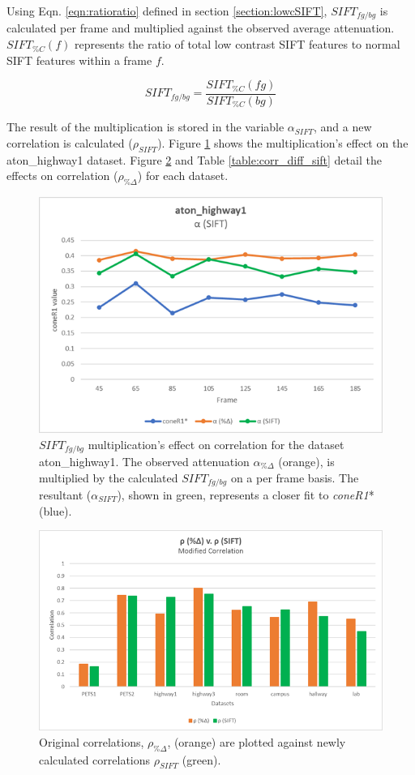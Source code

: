 Using Eqn. \ref{eqn:ratioratio} defined in section \ref{section:lowcSIFT}, $SIFT_{fg/bg}$ is calculated per frame and multiplied against the observed average attenuation. $SIFT_{\%C}(f)$ represents the ratio of total low contrast SIFT features to normal SIFT features within a frame $f$.

\begin{equation}
SIFT_{fg/bg} = \dfrac{SIFT_{\%C}(fg)}{SIFT_{\%C}(bg)}
\end{equation}

The result of the multiplication is stored in the variable $\alpha_{SIFT}$, and a new correlation is calculated ($\rho_{SIFT}$). Figure \ref{fig:highway1_sift} shows the multiplication's effect on the aton\_highway1 dataset. Figure \ref{fig:corr_diff_sift} and Table \ref{table:corr_diff_sift} detail the effects on correlation ($\rho_{\%\Delta}$) for each dataset.

\begin{figure}
  \centering
  \includegraphics[width=.8\linewidth]{figures/highway1_sift.jpg}
\caption{$SIFT_{fg/bg}$ multiplication's effect on correlation for the dataset aton\_highway1. The observed attenuation $\alpha_{\%\Delta}$ (orange), is multiplied by the calculated $SIFT_{fg/bg}$ on a per frame basis. The resultant ($\alpha_{SIFT}$), shown in green, represents a closer fit to \textit{coneR1}* (blue).}
\label{fig:highway1_sift}
\end{figure}

\begin{figure}
  \includegraphics[width=1\linewidth]{figures/sift_correlation_diff.jpg}
\caption{Original correlations, $\rho_{\%\Delta}$, (orange) are plotted against newly calculated correlations $\rho_{SIFT}$ (green).}
\label{fig:corr_diff_sift}
\end{figure}

